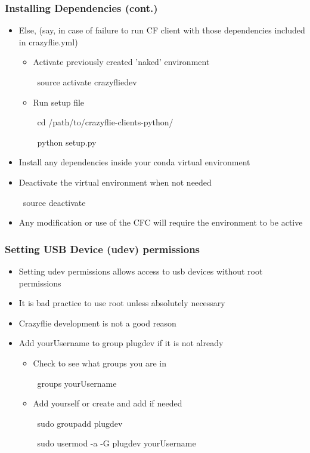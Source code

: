 \documentclass[t, xcolor=dvipsnames]{beamer} %
\begin{document}
\begin{frame}
	\frametitle{Installing Dependencies (cont.)}
	\begin{itemize}
		\item Else, (say, in case of failure to run CF client with those dependencies included in crazyflie.yml)
		\begin{itemize}
			\item Activate previously created 'naked' environment
			\begin{semiverbatim}
			\ source activate crazyfliedev
			\end{semiverbatim}
			\item Run setup file
			\begin{semiverbatim}
			\ cd /path/to/crazyflie-clients-python/
			\end{semiverbatim}
			\begin{semiverbatim}
			\ python setup.py
			\end{semiverbatim}

		\end{itemize}
		\item Install any dependencies inside your conda virtual environment
		\item Deactivate the virtual environment when not needed
			\begin{semiverbatim}
			\ source deactivate
			\end{semiverbatim}
		\item Any modification or use of the CFC will require the environment to be active
	\end{itemize}
\end{frame}

\begin{frame}
	\frametitle{Setting USB Device (udev) permissions}
	\begin{itemize}
		\item Setting udev permissions allows access to usb devices without root permissions
		\item It is bad practice to use root unless absolutely necessary
		\item Crazyflie development is not a good reason
		\item Add yourUsername to group plugdev if it is not already
		\begin{itemize}
			\item Check to see what groups you are in	
				\begin{semiverbatim}
				\ groups yourUsername
				\end{semiverbatim}
			\item Add yourself or create and add if needed
				\begin{semiverbatim}
				\ sudo groupadd plugdev
				\end{semiverbatim}
				\begin{semiverbatim}
				\ sudo usermod -a -G plugdev yourUsername
				\end{semiverbatim}
		\end{itemize}
	\end{itemize}
\end{frame}
\end{document}
